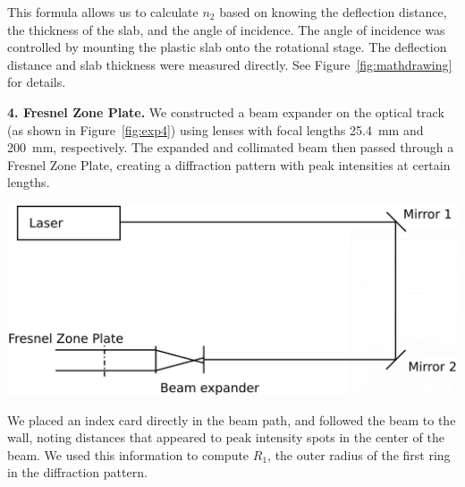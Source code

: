 \documentclass{article}
\newenvironment{2colfig}{
  \par\medskip\noindent\minipage{\linewidth}
} {
  \endminipage\par\medskip
}
\begin{document}
\begin{multicols*}{2}
This formula allows us to calculate $n_2$ based on knowing the deflection distance, the thickness of the slab, and the
angle of incidence. The angle of incidence was controlled by mounting the plastic slab onto the rotational stage. The
deflection distance and slab thickness were measured directly. See Figure~\ref{fig:mathdrawing} for details.

{\bf 4. Fresnel Zone Plate.}
We constructed a beam expander on the optical track (as shown in Figure~\ref{fig:exp4}) using lenses with focal lengths
\SI{25.4}{\milli\meter} and \SI{200}{\milli\meter}, respectively. The expanded and collimated beam then passed through a
Fresnel Zone Plate, creating a diffraction pattern with peak intensities at certain lengths.

\begin{2colfig}
  \center
  \includegraphics[scale=.2]{exp4}
  \label{fig:exp4}
\end{2colfig}

We placed an index card directly in the beam path, and followed the beam to the wall, noting distances that appeared to
peak intensity spots in the center of the beam. We used this information to compute $R_1$, the outer radius of the first
ring in the diffraction pattern.


\end{multicols*}
\end{document}
